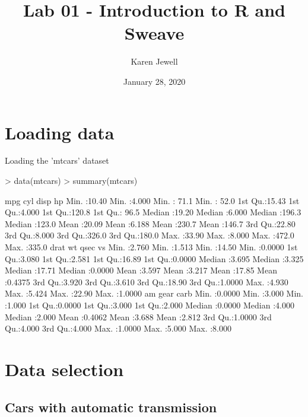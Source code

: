 \documentclass{article}
\begin{document}


\title{Lab 01 - Introduction to R and Sweave}
\author{Karen Jewell}
\date{January 28, 2020}

\maketitle

\section{Loading data}

Loading the 'mtcars' dataset

\begin{Schunk}
\begin{Sinput}
> data(mtcars)
> summary(mtcars)
\end{Sinput}
\begin{Soutput}
      mpg             cyl             disp             hp       
 Min.   :10.40   Min.   :4.000   Min.   : 71.1   Min.   : 52.0  
 1st Qu.:15.43   1st Qu.:4.000   1st Qu.:120.8   1st Qu.: 96.5  
 Median :19.20   Median :6.000   Median :196.3   Median :123.0  
 Mean   :20.09   Mean   :6.188   Mean   :230.7   Mean   :146.7  
 3rd Qu.:22.80   3rd Qu.:8.000   3rd Qu.:326.0   3rd Qu.:180.0  
 Max.   :33.90   Max.   :8.000   Max.   :472.0   Max.   :335.0  
      drat             wt             qsec             vs        
 Min.   :2.760   Min.   :1.513   Min.   :14.50   Min.   :0.0000  
 1st Qu.:3.080   1st Qu.:2.581   1st Qu.:16.89   1st Qu.:0.0000  
 Median :3.695   Median :3.325   Median :17.71   Median :0.0000  
 Mean   :3.597   Mean   :3.217   Mean   :17.85   Mean   :0.4375  
 3rd Qu.:3.920   3rd Qu.:3.610   3rd Qu.:18.90   3rd Qu.:1.0000  
 Max.   :4.930   Max.   :5.424   Max.   :22.90   Max.   :1.0000  
       am              gear            carb      
 Min.   :0.0000   Min.   :3.000   Min.   :1.000  
 1st Qu.:0.0000   1st Qu.:3.000   1st Qu.:2.000  
 Median :0.0000   Median :4.000   Median :2.000  
 Mean   :0.4062   Mean   :3.688   Mean   :2.812  
 3rd Qu.:1.0000   3rd Qu.:4.000   3rd Qu.:4.000  
 Max.   :1.0000   Max.   :5.000   Max.   :8.000  
\end{Soutput}
\end{Schunk}

\section{Data selection}
\subsection{Cars with automatic transmission}
\end{document}
